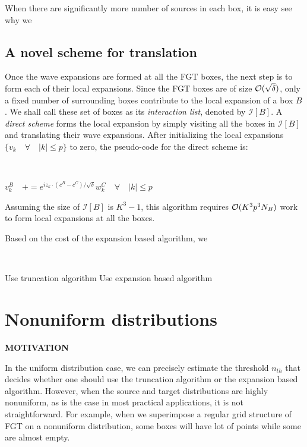 \documentclass[conference]{IEEEtran}
\begin{document}
When there are significantly more number of sources in each box, it is easy see why we


%

\subsection{A novel scheme for translation} 
Once the wave expansions are formed at all the FGT boxes, the next step is to form each of their local expansions. Since the FGT boxes are of size $\mathcal{O}(\sqrt{\delta})$, only a fixed number of surrounding boxes contribute to the local expansion of a box $B$. We shall call these set of boxes as its {\em interaction list}, denoted by $\mathcal{I} [B]$. A {\em direct scheme} forms the local expansion by simply visiting all the boxes in $\mathcal{I}[B]$ and translating their wave expansions. After initializing the local expansions $\{ v_k \quad \forall \quad |k| \leq p \}$ to zero, the pseudo-code for the direct scheme is:
%
{\tt
\begin{algorithmic}
           \STATE $ v_k^B \quad += e^{i z_k \cdot(c^B - c^C)/\sqrt{\delta}} w_k^C \quad \forall \quad |k| \leq p$
       \ENDFOR
\STATE
\end{algorithmic}
}
%
Assuming the size of $\mathcal{I}[B]$ is $K^3 - 1$, this algorithm requires $\mathcal{O}(K^3 p^3 N_B)$ work to form local expansions at all the boxes. 
%


Based on the cost of the expansion based algorithm, we 

{\tt
\begin{algorithmic}
\STATE
     \STATE Use truncation algorithm 
  \ELSE 
     \STATE Use expansion based algorithm
  \ENDIF
\STATE
\end{algorithmic}
}



\section{Nonuniform distributions} 

{\bf MOTIVATION}

In the uniform distribution case, we can precisely estimate the threshold $n_{th}$ that decides whether one should use the truncation algorithm or the expansion based algorithm. However, when the source and target distributions are highly nonuniform, as is the case in most practical applications, it is not straightforward. For example, when we superimpose a regular grid structure of FGT on a nonuniform distribution, some boxes will have lot of points while some are almost empty. 
\end{document}
